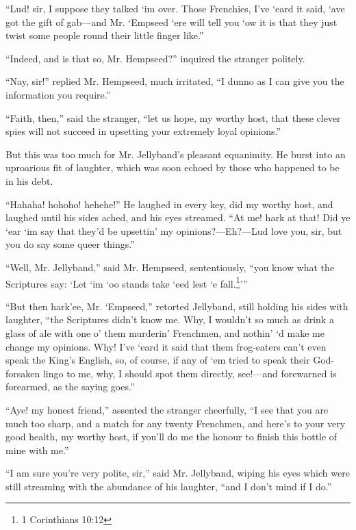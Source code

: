 \documentclass[paper=a5,BCOR=7mm,twoside,DIV=calc,12pt,usegeometry,chapterprefix,endperiod,headings=big]{scrbook}
\begin{document}
\enquote{Lud! sir, I suppose they talked `im over. Those Frenchies, I've `eard it said, `ave got the gift of gab---and Mr. `Empseed `ere will tell you `ow it is that they just twist some people round their little finger like.}

\enquote{Indeed, and is that so, Mr. Hempseed?} inquired the stranger politely.

\enquote{Nay, sir!} replied Mr. Hempseed, much irritated, \enquote{I dunno as I can give you the information you require.}

\enquote{Faith, then,} said the stranger, \enquote{let us hope, my worthy host, that these clever spies will not succeed in upsetting your extremely loyal opinions.}

But this was too much for Mr. Jellyband's pleasant equanimity. He burst into an uproarious fit of laughter, which was soon echoed by those who happened to be in his debt.

\enquote{Hahaha! hohoho! hehehe!} He laughed in every key, did my worthy host, and laughed until his sides ached, and his eyes streamed. \enquote{At me! hark at that! Did ye `ear `im say that they'd be upsettin’ my opinions?---Eh?---Lud love you, sir, but you do say some queer things.}

\enquote{Well, Mr. Jellyband,} said Mr. Hempseed, sententiously, \enquote{you know what the Scriptures say: \enquote{Let `im `oo stands take `eed lest `e fall.\footnote{1 Corinthians 10:12}}}

\enquote{But then hark'ee, Mr. `Empseed,} retorted Jellyband, still holding his sides with laughter, \enquote{the Scriptures didn't know me. Why, I wouldn't so much as drink a glass of ale with one o’ them murderin’ Frenchmen, and nothin’ `d make me change my opinions. Why! I've `eard it said that them frog-eaters can't even speak the King's English, so, of course, if any of `em tried to speak their God-forsaken lingo to me, why, I should spot them directly, see!---and forewarned is forearmed, as the saying goes.}

\enquote{Aye! my honest friend,} assented the stranger cheerfully, \enquote{I see that you are much too sharp, and a match for any twenty Frenchmen, and here's to your very good health, my worthy host, if you'll do me the honour to finish this bottle of mine with me.}

\enquote{I am sure you're very polite, sir,} said Mr. Jellyband, wiping his eyes which were still streaming with the abundance of his laughter, \enquote{and I don't mind if I do.}
\end{document}
